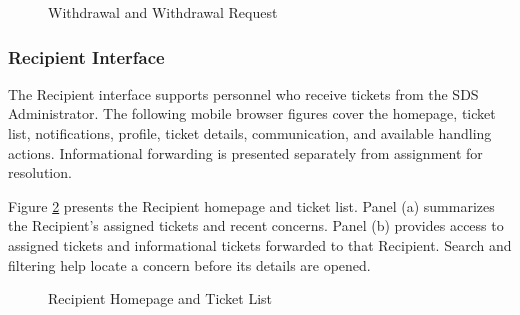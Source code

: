 \renewcommand{\thefigure}{5.13}
\begin{figure}[htbp]
    \centering
    \begin{minipage}[t]{0.43\linewidth}
        \centering
        \vspace{0pt}
        \par{}\par
    \end{minipage}\hspace{0.04\linewidth}
    \begin{minipage}[t]{0.43\linewidth}
        \centering
        \vspace{0pt}
        \par{}\par
    \end{minipage}
    \caption{Withdrawal and Withdrawal Request}
    \label{fig:withdraw}
\end{figure}
\FloatBarrier

\FloatBarrier
\subsubsection{Recipient Interface}

The Recipient interface supports personnel who receive tickets from the SDS Administrator. The following mobile browser figures cover the homepage, ticket list, notifications, profile, ticket details, communication, and available handling actions. Informational forwarding is presented separately from assignment for resolution.

Figure \ref{fig:rhome} presents the Recipient homepage and ticket list. Panel (a) summarizes the Recipient's assigned tickets and recent concerns. Panel (b) provides access to assigned tickets and informational tickets forwarded to that Recipient. Search and filtering help locate a concern before its details are opened.

\renewcommand{\thefigure}{5.14}
\begin{figure}[htbp]
    \centering
    \begin{minipage}[t]{0.43\linewidth}
        \centering
        \vspace{0pt}
        \par{}\par
    \end{minipage}\hspace{0.04\linewidth}
    \begin{minipage}[t]{0.43\linewidth}
        \centering
        \vspace{0pt}
        \par{}\par
    \end{minipage}
    \caption{Recipient Homepage and Ticket List}
    \label{fig:rhome}
\end{figure}
\FloatBarrier

